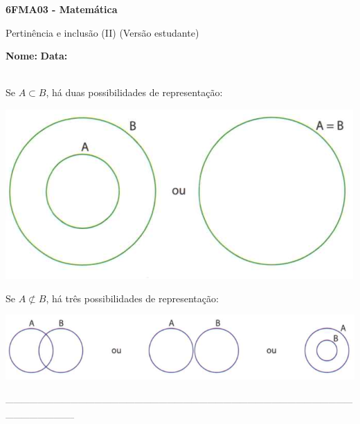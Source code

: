 \documentclass[a4paper,14pt]{article}
\begin{document}
	
	\noindent\textbf{6FMA03 - Matemática} 
	
	\begin{center}Pertinência e inclusão (II) (Versão estudante)
	\end{center}
	
	\noindent\textbf{Nome:} \underline{\hspace{10cm}}
	\noindent\textbf{Data:} \underline{\hspace{4cm}}
	
	\noindent \\ Se $A \subset B$, há duas possibilidades de representação: \\
	\begin{center}
		\includegraphics[width=0.7\linewidth]{6FMA03_imagens/imagem1}
	\end{center} 
	Se $A \not\subset B$, há três possibilidades de representação: \\
	\begin{center}
		\includegraphics[width=1\linewidth]{6FMA03_imagens/imagem2}
	\end{center} 
	\noindent\textsubscript{-----------------------------------------------------------------------------------------------------------------------------------------------------------}
\end{document}
